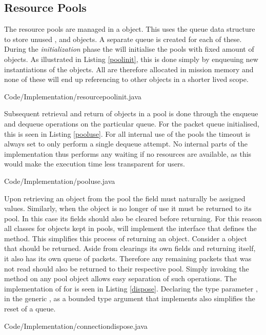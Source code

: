 \subsection{Resource Pools} %
\label{sub:resource_pools}
The resource pools are managed in a  object. This uses the queue data structure to store unused ,  and  objects. A separate queue is created for each of these. During the \textit{initialization} phase the  will initialise the pools with fixed amount of objects. As illustrated in Listing \ref{poolinit}, this is done simply by enqueuing new instantiations of the objects. All are therefore allocated in mission memory and none of these will end up referencing to other objects in a shorter lived scope. 

{Code/Implementation/resourcepoolinit.java}

Subsequent retrieval and return of objects in a pool is done through the enqueue and dequeue operations on the particular queue. For the packet queue initialised, this is seen in Listing \ref{pooluse}. For all internal use of the pools the timeout is always set to only perform a single dequeue attempt. No internal parts of the implementation thus performs any waiting if no resources are available, as this would make the execution time less transparent for users.

{Code/Implementation/pooluse.java}

Upon retrieving an object from the pool the field must naturally be assigned values. Similarly, when the object is no longer of use it must be returned to its pool. In this case its fields should also be cleared before returning. For this reason all classes for objects kept in pools, will implement the  interface that defines the  method. This simplifies this process of returning an object. Consider a  object that should be returned. Aside from clearings its own fields and returning itself, it also has its own queue of packets. Therefore any remaining packets that was not read should also be returned to their respective pool. Simply invoking the  method on any pool object allows easy separation of such operations. The implementation of  for  is seen in Listing \ref{dispose}. Declaring the type parameter , in the generic , as a bounded type argument that implements  also simplifies the reset of a queue.

{Code/Implementation/connectiondispose.java}

